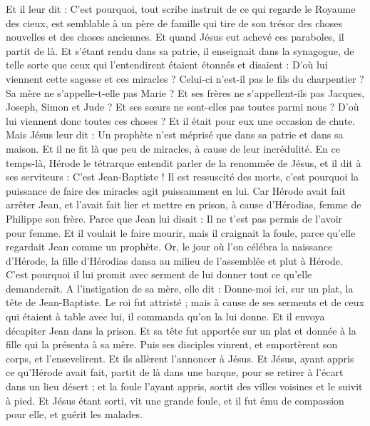 \begin{multicols}{2}
Et il leur dit : C'est pourquoi, tout scribe instruit de ce qui regarde le Royaume des cieux, est semblable à un père de famille qui tire de son trésor des choses nouvelles et des choses anciennes.
Et quand Jésus eut achevé ces paraboles, il partit de là.
Et s'étant rendu dans sa patrie, il enseignait dans la synagogue, de telle sorte que ceux qui l'entendirent étaient étonnés et disaient : D'où lui viennent cette sagesse et ces miracles ?
Celui-ci n'est-il pas le fils du charpentier ? Sa mère ne s'appelle-t-elle pas Marie ? Et ses frères ne s'appellent-ils pas Jacques, Joseph, Simon et Jude ?
Et ses sœurs ne sont-elles pas toutes parmi nous ? D'où lui viennent donc toutes ces choses ?
Et il était pour eux une occasion de chute. Mais Jésus leur dit : Un prophète n'est méprisé que dans sa patrie et dans sa maison.
Et il ne fit là que peu de miracles, à cause de leur incrédulité.
\VerseOne{}En ce temps-là, Hérode le tétrarque entendit parler de la renommée de Jésus, et il dit à ses serviteurs : C'est Jean-Baptiste !
Il est ressuscité des morts, c'est pourquoi la puissance de faire des miracles agit puissamment en lui.
Car Hérode avait fait arrêter Jean, et l'avait fait lier et mettre en prison, à cause d'Hérodias, femme de Philippe son frère.
Parce que Jean lui disait : Il ne t'est pas permis de l'avoir pour femme.
Et il voulait le faire mourir, mais il craignait la foule, parce qu'elle regardait Jean comme un prophète.
Or, le jour où l'on célébra la naissance d'Hérode, la fille d'Hérodias dansa au milieu de l'assemblée et plut à Hérode.
C'est pourquoi il lui promit avec serment de lui donner tout ce qu'elle demanderait.
A l'instigation de sa mère, elle dit : Donne-moi ici, sur un plat, la tête de Jean-Baptiste.
Le roi fut attristé ; mais à cause de ses serments et de ceux qui étaient à table avec lui, il commanda qu'on la lui donne.
Et il envoya décapiter Jean dans la prison.
Et sa tête fut apportée sur un plat et donnée à la fille qui la présenta à sa mère.
Puis ses disciples vinrent, et emportèrent son corps, et l'ensevelirent. Et ils allèrent l'annoncer à Jésus.
Et Jésus, ayant appris ce qu'Hérode avait fait, partit de là dans une barque, pour se retirer à l'écart dans un lieu désert ; et la foule l'ayant appris, sortit des villes voisines et le suivit à pied.
Et Jésus étant sorti, vit une grande foule, et il fut ému de compassion pour elle, et guérit les malades.

\end{multicols}
